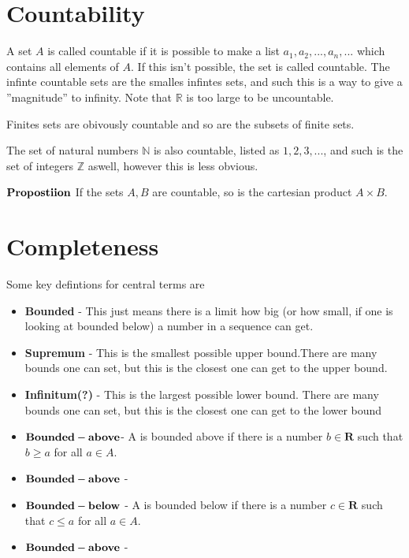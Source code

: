 \documentclass[12pt,letterpaper]{article}
\begin{document}
\section*{Countability}
A set $A$ is called countable if it is possible to make a list $a_1, a_2, ..., a_n,...$ which contains all elements of $A$. If this isn't possible, the set is called countable. 
The infinte countable sets are the smalles infintes sets, and such this is a way to give a ''magnitude'' to infinity. Note that $\mathbb{R}$ is too large to be uncountable.

\noindent
Finites sets are obivously countable and so are the subsets of finite sets.

\noindent
The set of natural numbers $\mathbb{N}$ is also countable, listed as $1,2,3,...$, and such is the set of integers $\mathbb{Z}$ aswell, however this is less obvious.

\noindent

$\bold{Propostiion}$ If the sets $A,B$ are countable, so is the cartesian product $A \times B$.



\section*{Completeness}



Some key defintions for central terms are 
\begin{itemize}
	\item \textbf{Bounded} - This just means there is a limit how big (or how small, if one is looking at bounded below) a number in a sequence can get. 
	\item \textbf{Supremum} - This is the smallest possible upper bound.There are many bounds one can set, but this is the closest one can get to the upper bound. 
	\item \textbf{Infinitum(?)} - This is the largest possible lower bound. There are many bounds one can set, but this is the closest one can get to the lower bound
	\item $\bold{Bounded-above}$- A is bounded above if there is a number $b\in\mathbf{R}$ such that $b\ge a$ for all $a\in A$.
	\item $\bold{Bounded-above}$ - 
	\item $\bold{Bounded-below}$ - A is bounded below if there is a number $c\in\mathbf{R}$ such that $c\le a$ for all $a\in A$.
	\item $\bold{Bounded-above}$ - 
\end{itemize}
\end{document}
